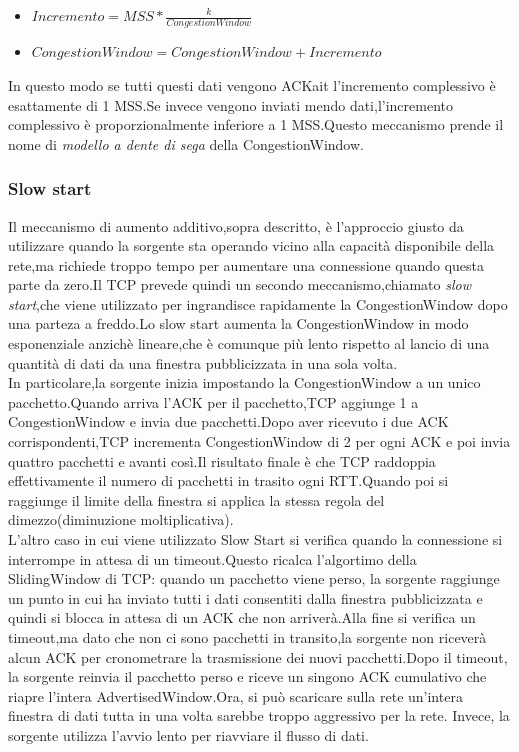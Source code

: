 \begin{itemize}
  \item $Incremento = MSS * \frac{k}{CongestionWindow}$
  \item $CongestionWindow = CongestionWindow + Incremento$
\end{itemize}
In questo modo se tutti questi dati vengono ACKait l'incremento complessivo è esattamente di 1 MSS.Se invece vengono inviati mendo dati,l'incremento complessivo è proporzionalmente inferiore a 1 MSS.Questo meccanismo prende il nome di \textit{modello a dente di sega} della CongestionWindow.
\subsubsection{Slow start}
Il meccanismo di aumento additivo,sopra descritto, è l'approccio giusto da utilizzare quando la sorgente sta operando vicino alla capacità disponibile della rete,ma richiede troppo tempo per aumentare una connessione quando questa parte da zero.Il TCP prevede quindi un secondo meccanismo,chiamato \textit{slow start},che viene utilizzato per ingrandisce rapidamente la CongestionWindow dopo una parteza a freddo.Lo slow start aumenta la CongestionWindow in modo esponenziale anzichè lineare,che è comunque più lento rispetto al lancio di una quantità di dati da una finestra pubblicizzata in una sola volta.\\
In particolare,la sorgente inizia impostando la CongestionWindow a un unico pacchetto.Quando arriva l'ACK per il pacchetto,TCP aggiunge 1 a CongestionWindow e invia due pacchetti.Dopo aver ricevuto i due ACK corrispondenti,TCP incrementa CongestionWindow di 2 per ogni ACK e poi invia quattro pacchetti e avanti così.Il risultato finale è che TCP raddoppia effettivamente il numero di pacchetti in trasito ogni RTT.Quando poi si raggiunge il limite della finestra si applica la stessa regola del dimezzo(diminuzione moltiplicativa).\\
L'altro caso in cui viene utilizzato Slow Start si verifica quando la connessione si interrompe in attesa di un timeout.Questo ricalca l'algortimo della SlidingWindow di TCP: quando un pacchetto viene perso, la sorgente raggiunge un punto in cui ha inviato tutti i dati consentiti dalla finestra pubblicizzata e quindi si blocca in attesa di un ACK che non arriverà.Alla fine si verifica un timeout,ma dato che non ci sono pacchetti in transito,la sorgente non riceverà alcun ACK per cronometrare la trasmissione dei nuovi pacchetti.Dopo il timeout, la sorgente reinvia il pacchetto perso e riceve un singono ACK cumulativo che riapre l'intera AdvertisedWindow.Ora, si può scaricare sulla rete un’intera finestra di dati tutta in una volta sarebbe troppo aggressivo per la rete. Invece, la sorgente utilizza l’avvio lento per riavviare il flusso di dati.\\
